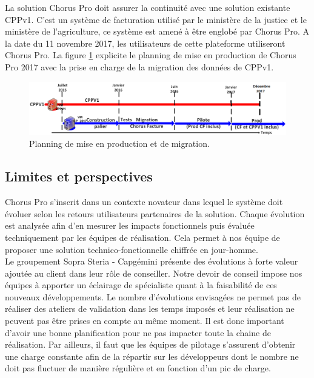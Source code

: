 \documentclass[12pt,a4paper]{article}
\begin{document}
\clearpage
\newpage
La solution Chorus Pro doit assurer la continuité avec une solution existante CPPv1. C'est un système de facturation utilisé par le ministère de la justice et le ministère de l’agriculture, ce système est amené à être englobé par Chorus Pro. A la date du 11 novembre 2017, les utilisateurs de cette plateforme utiliseront Chorus Pro. La figure \ref{friseCpp} explicite le planning de mise en production de Chorus Pro 2017 avec la prise en charge de la migration des données de CPPv1.
\begin{figure}[!hp]
		\begin{center}
			\includegraphics[width=\textwidth,height=\textheight,keepaspectratio]{friseCpp.png}
			\caption{Planning de mise en production et de migration.}
			\label{friseCpp}
		\end{center}
\end{figure}
\subsection{Limites et perspectives}
Chorus Pro s'inscrit dans un contexte novateur dans lequel le système doit évoluer selon les retours utilisateurs partenaires de la solution. Chaque évolution est analysée afin d'en mesurer les impacts fonctionnels puis évaluée techniquement par les équipes de réalisation. Cela permet à nos équipe de proposer une solution technico-fonctionnelle chiffrée en jour-homme.\\
Le groupement Sopra Steria - Capgémini présente des évolutions à forte valeur ajoutée au client dans leur rôle de conseiller. Notre devoir de conseil impose nos équipes à apporter un éclairage de spécialiste quant à la faisabilité de ces nouveaux développements. Le nombre d'évolutions envisagées ne permet pas de réaliser des ateliers de validation dans les temps imposés et leur réalisation ne peuvent pas être prises en compte au même moment. Il est donc important d'avoir une bonne planification pour ne pas impacter toute la chaine de réalisation. Par ailleurs, il faut que les équipes de pilotage s'assurent d'obtenir une charge constante afin de la répartir sur les développeurs dont le nombre ne doit pas fluctuer de manière régulière et en fonction d'un pic de charge.\\ 
\clearpage
\newpage
\end{document}
